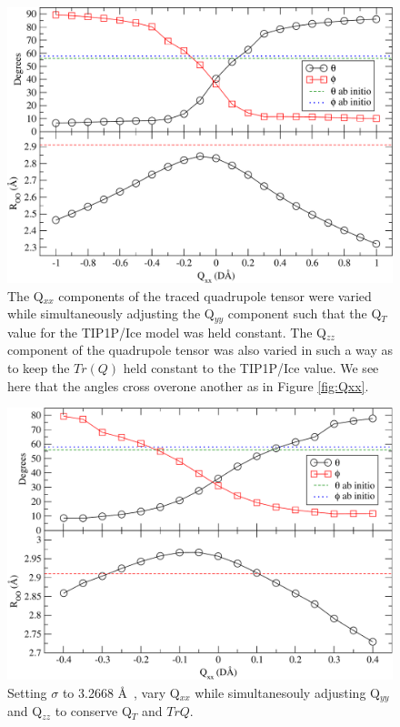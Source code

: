 \begin{figure}[h!]
\includegraphics[width = \linewidth]{Figures/Test5_plot.pdf}
\caption{\label{fig:Qxx3} The Q$_{xx}$ components of the traced quadrupole tensor were varied while simultaneously adjusting the Q$_{yy}$ component such that the  Q$_T$ value for the TIP1P/Ice model was held constant. The Q$_{zz}$ component of the quadrupole tensor was also varied in such a way as to keep the $Tr(Q)$ held constant to the TIP1P/Ice value. We see here that the angles cross overone another as in Figure \ref{fig:Qxx}.}
\end{figure}

\begin{figure}[h!]
\includegraphics[width = \linewidth]{Figures/Test6_plot.pdf}
\caption{\label{fig:Qxx4} Setting $\sigma$ to 3.2668 \AA~, vary Q$_{xx}$ while simultanesouly adjusting Q$_{yy}$ and Q$_{zz}$ to conserve Q$_T$ and $TrQ$.}
\end{figure}

